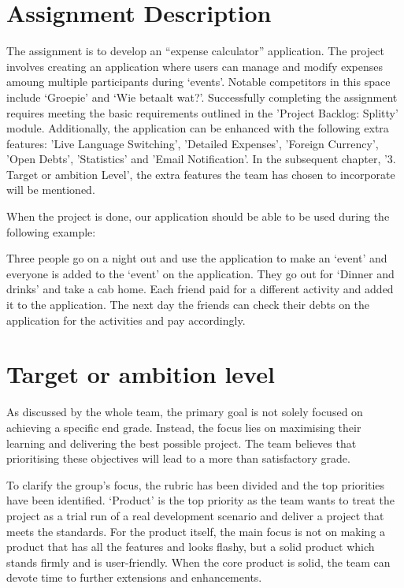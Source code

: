 \documentclass[sigconf,nonacm]{acmart}
\begin{document}
\section{Assignment Description}
The assignment is to develop an “expense calculator” application. The project involves creating an application where users can manage and modify expenses amoung multiple participants during ‘events’. Notable competitors in this space include ‘Groepie’ and ‘Wie betaalt wat?’. Successfully completing the assignment requires meeting the basic requirements outlined in the 'Project Backlog: Splitty' module. Additionally, the application can be enhanced with the following extra features: 'Live Language Switching', 'Detailed Expenses', 'Foreign Currency', 'Open Debts', 'Statistics' and 'Email Notification'. In the subsequent chapter, '3. Target or ambition Level', the extra features the team has chosen to incorporate will be mentioned.

When the project is done, our application should be able to be used during the following example:

Three people go on a night out and use the application to make an ‘event’ and everyone is added to the ‘event’ on the application. They go out for ‘Dinner and drinks’ and take a cab home. Each friend paid for a different activity and added it to the application. The next day the friends can check their debts on the application for the activities and pay accordingly.

\section{Target or ambition level}
As discussed by the whole team, the primary goal is not solely focused on achieving a specific end grade. Instead, the focus lies on maximising their learning and delivering the best possible project. The team believes that prioritising these objectives will lead to a more than satisfactory grade.

To clarify the group’s focus, the rubric has been divided and the top priorities have been identified. ‘Product’ is the top priority as the team wants to treat the project as a trial run of a real development scenario and deliver a project that meets the standards. For the product itself, the main focus is not on making a product that has all the features and looks flashy, but a solid product which stands firmly and is user-friendly.
When the core product is solid, the team can devote time to further extensions and enhancements.
\end{document}
